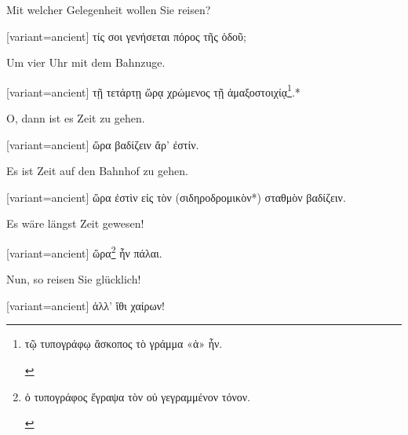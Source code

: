 Mit welcher Gelegenheit wollen Sie reisen?

\switchcolumn

\begin{greek}[variant=ancient]%
τίς σοι γενήσεται πόρος τῆς ὁδοῦ;

\end{greek}%
\switchcolumn*

Um vier Uhr mit dem Bahnzuge.

\switchcolumn

\begin{greek}[variant=ancient]%
τῇ τετάρτῃ ὥρᾳ χρώμενος τῇ ἁμαξοστοιχίᾳ\footnote{\begin{latin}%
\textgreek[variant=ancient]{τῷ τυπογράφῳ ἄσκοπος τὸ γράμμα «ἁ» ἦν.}\end{latin}%
}.{*}

\end{greek}%
\switchcolumn*

O, dann ist es Zeit zu gehen.

\switchcolumn

\begin{greek}[variant=ancient]%
ὥρα βαδίζειν ἄρ' ἐστίν.

\end{greek}%
\switchcolumn*

Es ist Zeit auf den Bahnhof zu gehen.

\switchcolumn

\begin{greek}[variant=ancient]%
ὥρα ἐστὶν εἰς τὸν (σιδηροδρομικὸν{*}) σταθμὸν βαδίζειν.

\end{greek}%
\switchcolumn*

Es wäre längst Zeit gewesen!

\switchcolumn

\begin{greek}[variant=ancient]%
ὥρα\footnote{\begin{latin}%
\textgreek[variant=ancient]{ὁ τυπογράφος ἔγραψα τὸν οὐ γεγραμμένον
τόνον.}\end{latin}%
} ἦν πάλαι.

\end{greek}%
\switchcolumn*

Nun, so reisen Sie glücklich!

\switchcolumn

\begin{greek}[variant=ancient]%
ἀλλ' ἴθι χαίρων!

\end{greek}%
\switchcolumn*

